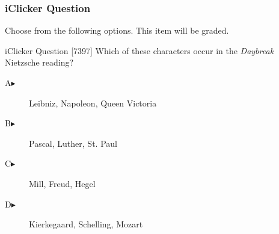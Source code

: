 \begin{frame}
  \frametitle{iClicker Question}
Choose from the following options. This item will be graded.
\begin{block}{iClicker Question}
[7397] Which of these characters occur in the \emph{Daybreak} Nietzsche reading?
\end{block}
\begin{description}
\item[A\hspace{.2in}$\blacktriangleright$] Leibniz, Napoleon, Queen Victoria
\item[B\hspace{.2in}$\blacktriangleright$] Pascal, Luther, St. Paul
\item[C\hspace{.2in}$\blacktriangleright$] Mill, Freud, Hegel
\item[D\hspace{.2in}$\blacktriangleright$] Kierkegaard, Schelling, Mozart
\end{description}
\end{frame}